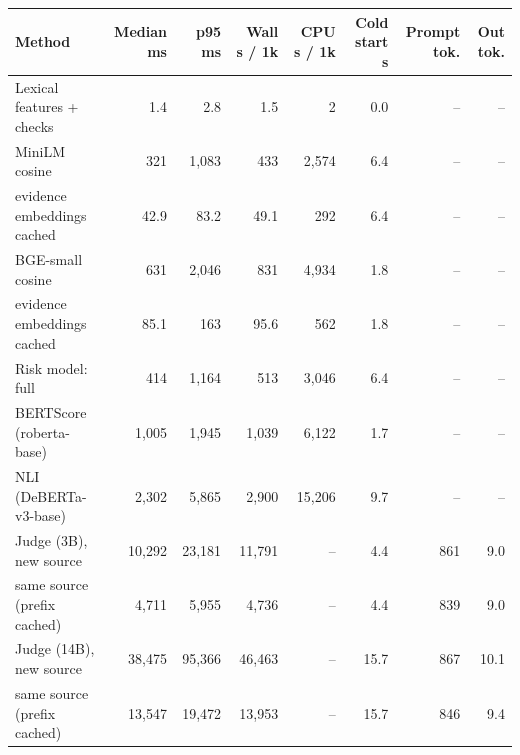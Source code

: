 \begin{tabular}{lrrrrrrr}
\toprule
Method & Median ms & p95 ms & Wall s / 1k & CPU s / 1k & Cold start s & Prompt tok. & Out tok. \\
\midrule
Lexical features + checks & 1.4 & 2.8 & 1.5 & 2 & 0.0 & -- & -- \\
MiniLM cosine & 321 & 1,083 & 433 & 2,574 & 6.4 & -- & -- \\
\quad evidence embeddings cached & 42.9 & 83.2 & 49.1 & 292 & 6.4 & -- & -- \\
BGE-small cosine & 631 & 2,046 & 831 & 4,934 & 1.8 & -- & -- \\
\quad evidence embeddings cached & 85.1 & 163 & 95.6 & 562 & 1.8 & -- & -- \\
Risk model: full & 414 & 1,164 & 513 & 3,046 & 6.4 & -- & -- \\
\midrule
BERTScore (roberta-base) & 1,005 & 1,945 & 1,039 & 6,122 & 1.7 & -- & -- \\
NLI (DeBERTa-v3-base) & 2,302 & 5,865 & 2,900 & 15,206 & 9.7 & -- & -- \\
\midrule
Judge (3B), new source & 10,292 & 23,181 & 11,791 & -- & 4.4 & 861 & 9.0 \\
\quad same source (prefix cached) & 4,711 & 5,955 & 4,736 & -- & 4.4 & 839 & 9.0 \\
\midrule
Judge (14B), new source & 38,475 & 95,366 & 46,463 & -- & 15.7 & 867 & 10.1 \\
\quad same source (prefix cached) & 13,547 & 19,472 & 13,953 & -- & 15.7 & 846 & 9.4 \\
\bottomrule
\end{tabular}
